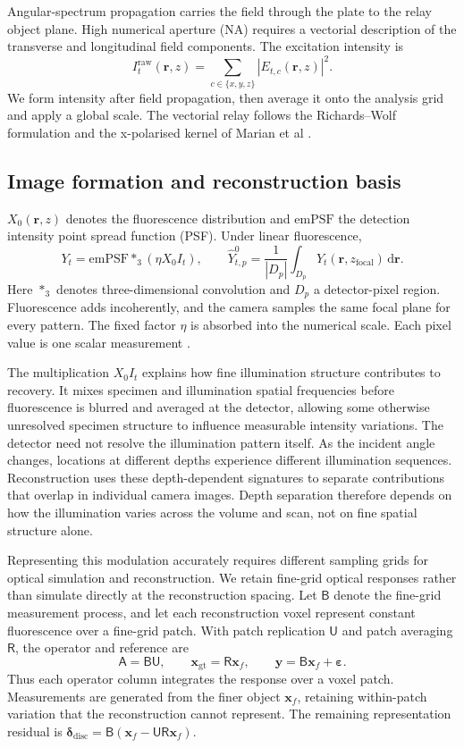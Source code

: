 Angular-spectrum propagation carries the field through the plate to the relay object plane. High numerical aperture (NA) requires a vectorial description of the transverse and longitudinal field components. The excitation intensity is
\[
I_t^{\mathrm{raw}}(\mathbf r,z)
=\sum_{c\in\{x,y,z\}}|E_{t,c}(\mathbf r,z)|^2.
\tag{2}
\]
We form intensity after field propagation, then average it onto the analysis grid and apply a global scale. The vectorial relay follows the Richards--Wolf formulation and the x-polarised kernel of Marian et al \cite{richards1959,marian2007}.

\subsection{Image formation and reconstruction basis}

\(X_0(\mathbf r,z)\) denotes the fluorescence distribution and \(\mathrm{emPSF}\) the detection intensity point spread function (PSF). Under linear fluorescence,
\[
Y_t=\mathrm{emPSF}*_3(\eta X_0 I_t),
\qquad
\widehat Y^0_{t,p}
=\frac{1}{|D_p|}\int_{D_p}
Y_t(\mathbf r,z_{\mathrm{focal}})\,\mathrm d\mathbf r.
\tag{3}
\]
Here \(*_3\) denotes three-dimensional convolution and \(D_p\) a detector-pixel region. Fluorescence adds incoherently, and the camera samples the same focal plane for every pattern. The fixed factor \(\eta\) is absorbed into the numerical scale. Each pixel value is one scalar measurement \cite{zheng2021,wijethilake2023}.

The multiplication \(X_0 I_t\) explains how fine illumination structure contributes to recovery. It mixes specimen and illumination spatial frequencies before fluorescence is blurred and averaged at the detector, allowing some otherwise unresolved specimen structure to influence measurable intensity variations. The detector need not resolve the illumination pattern itself. As the incident angle changes, locations at different depths experience different illumination sequences. Reconstruction uses these depth-dependent signatures to separate contributions that overlap in individual camera images. Depth separation therefore depends on how the illumination varies across the volume and scan, not on fine spatial structure alone.

Representing this modulation accurately requires different sampling grids for optical simulation and reconstruction. We retain fine-grid optical responses rather than simulate directly at the reconstruction spacing. Let \(\mathsf B\) denote the fine-grid measurement process, and let each reconstruction voxel represent constant fluorescence over a fine-grid patch. With patch replication \(\mathsf U\) and patch averaging \(\mathsf R\), the operator and reference are
\[
\mathsf A=\mathsf B\mathsf U,
\qquad
\mathbf x_{\mathrm{gt}}=\mathsf R\mathbf x_f,
\qquad
\mathbf y=\mathsf B\mathbf x_f+\boldsymbol\varepsilon.
\tag{4}
\]
Thus each operator column integrates the response over a voxel patch. Measurements are generated from the finer object \(\mathbf x_f\), retaining within-patch variation that the reconstruction cannot represent. The remaining representation residual is \(\boldsymbol\delta_{\mathrm{disc}}=\mathsf B(\mathbf x_f-\mathsf U\mathsf R\mathbf x_f)\).

